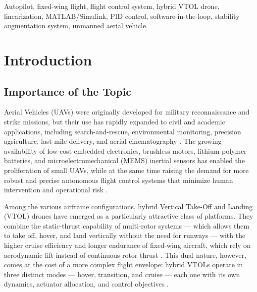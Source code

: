 \documentclass{ieeeaccess}
\begin{document}
\begin{keywords}
Autopilot, fixed-wing flight, flight control system, hybrid VTOL drone, linearization, MATLAB/Simulink, PID control, software-in-the-loop, stability augmentation system, unmanned aerial vehicle.
\end{keywords}

\titlepgskip=-21pt

\maketitle

\section{Introduction}
\label{sec:introduction}

\subsection{Importance of the Topic}

 Aerial Vehicles (UAVs) were originally developed for military reconnaissance and strike missions, but their use has rapidly expanded to civil and academic applications, including search-and-rescue, environmental monitoring, precision agriculture, last-mile delivery, and aerial cinematography \cite{beard2005autonomous,marshall2016introduction}. The growing availability of low-cost embedded electronics, brushless motors, lithium-polymer batteries, and microelectromechanical (MEMS) inertial sensors has enabled the proliferation of small UAVs, while at the same time raising the demand for more robust and precise autonomous flight control systems that minimize human intervention and operational risk \cite{garcia2010multi,valavanis2015future}.

Among the various airframe configurations, hybrid Vertical Take-Off and Landing (VTOL) drones have emerged as a particularly attractive class of platforms. They combine the static-thrust capability of multi-rotor systems --- which allows them to take off, hover, and land vertically without the need for runways --- with the higher cruise efficiency and longer endurance of fixed-wing aircraft, which rely on aerodynamic lift instead of continuous rotor thrust \cite{saeed2018survey,ducard2021review}. This dual nature, however, comes at the cost of a more complex flight envelope: hybrid VTOLs operate in three distinct modes --- hover, transition, and cruise --- each one with its own dynamics, actuator allocation, and control objectives \cite{ducard2021review}.
\end{document}
